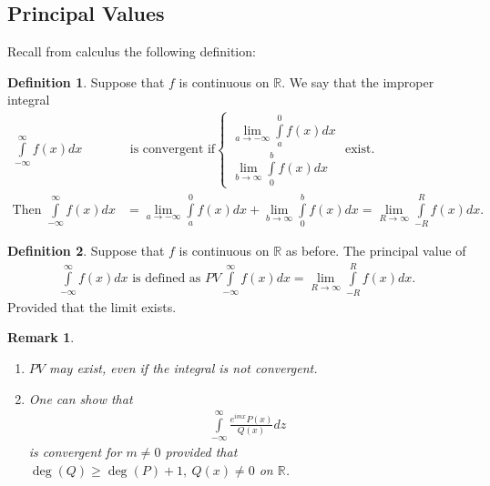 \documentclass[12pt, a4paper]{article}
\theoremstyle{plain}
\newtheorem{rem}{Remark}
\theoremstyle{definition}
\newtheorem{definition}{Definition} %
\begin{document}
		\subsection{Principal Values} %
		\label{sub:principal_values}
			Recall from calculus the following definition:

			\begin{definition}
				Suppose that $f$ is continuous on $\mathbb{R}$. We say that the improper integral
				\begin{align*}
					\int\limits_{-\infty}^{\infty}f(x)dx&\text{ is convergent if}
					\begin{cases}
						\displaystyle\lim\limits_{a\to-\infty}\int\limits_{a}^{0}f(x)dx\\[0.3cm]
						\displaystyle\lim\limits_{b\to\infty}\int\limits_{0}^{b}f(x)dx
					\end{cases}\text{ exist.}\\
					\text{Then } \int\limits_{-\infty}^{\infty}f(x)dx &=
					\lim\limits_{a\to-\infty}\int\limits_{a}^{0}f(x)dx +
					\lim\limits_{b\to\infty}\int\limits_{0}^{b}f(x)dx =
					\lim\limits_{R\to\infty}\int\limits_{-R}^{R}f(x)dx.
				\end{align*}
			\end{definition}

			\begin{definition}
				Suppose that $f$ is continuous on $\mathbb{R}$ as before. The principal value of 
				\begin{align*}
					\int\limits_{-\infty}^{\infty}f(x)dx
					\text{ is defined as }
					PV\int\limits_{-\infty}^{\infty}f(x)dx =
					\lim\limits_{R\to\infty}\int\limits_{-R}^{R}f(x)dx.
				\end{align*}
				Provided that the limit exists.\\
			\end{definition}

			\begin{rem}
				\begin{enumerate}
					\item $PV$ may exist, even if the integral is not convergent.
					\item One can show that
					\begin{align*}
						\int\limits_{-\infty}^{\infty}\frac{e^{imx}P(x)}{Q(x)}dz
					\end{align*}
					is convergent for $m\not=0$ provided that $\deg(Q)\ge \deg(P)+1,\:Q(x)\not=0$ on $\mathbb{R}$.\\
				\end{enumerate}
			\end{rem}
\end{document}

